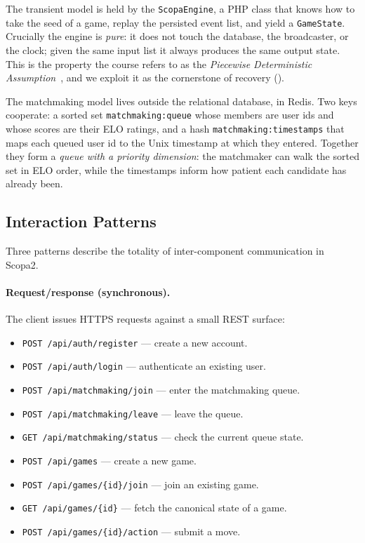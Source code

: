 \documentclass{scrartcl}
\begin{document}
The transient model is held by the \texttt{ScopaEngine}, a PHP class
that knows how to take the seed of a game, replay the persisted event
list, and yield a \texttt{GameState}. Crucially the engine is
\emph{pure}: it does not touch the database, the broadcaster, or the
clock; given the same input list it always produces the same output
state. This is the property the course refers to as the
\emph{Piecewise Deterministic Assumption}~\citep{elnozahy2002survey},
and we exploit it as the cornerstone of recovery
().

The matchmaking model lives outside the relational database, in Redis.
Two keys cooperate: a sorted set \texttt{matchmaking:queue} whose
members are user ids and whose scores are their ELO ratings, and a
hash \texttt{matchmaking:timestamps} that maps each queued user id to
the Unix timestamp at which they entered. Together they form a
\emph{queue with a priority dimension}: the matchmaker can walk the
sorted set in ELO order, while the timestamps inform how patient each
candidate has already been.

\subsection{Interaction Patterns}\label{interaction}

Three patterns describe the totality of inter-component communication
in Scopa2.

\paragraph{Request/response (synchronous).} The client issues HTTPS
requests against a small REST surface:

\begin{itemize}[leftmargin=1.4em]
  \item \texttt{POST /api/auth/register} --- create a new account.
  \item \texttt{POST /api/auth/login} --- authenticate an existing user.
  \item \texttt{POST /api/matchmaking/join} --- enter the matchmaking queue.
  \item \texttt{POST /api/matchmaking/leave} --- leave the queue.
  \item \texttt{GET\phantom{T} /api/matchmaking/status} --- check the
  current queue state.
  \item \texttt{POST /api/games} --- create a new game.
  \item \texttt{POST /api/games/\{id\}/join} --- join an existing game.
  \item \texttt{GET\phantom{T} /api/games/\{id\}} --- fetch the
  canonical state of a game.
  \item \texttt{POST /api/games/\{id\}/action} --- submit a move.
\end{itemize}
\end{document}
